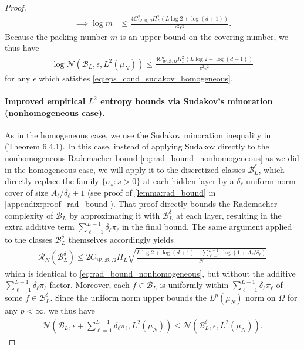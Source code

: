 \documentclass{article}
\def\cB{{\mathcal{B}}}
\def\cN{{\mathcal{N}}}
\def\cR{{\mathcal{R}}}
\def\cW{{\mathcal{W}}}
\begin{document}
\begin{appendices}
\begin{proof}
\begin{align}
    \implies \log m &\leq \frac{4 C_{\cW, \cB, \Omega}^2 \Pi_L^2 \left( L \log 2 + \log(d+1) \right)}{c^2 \epsilon^2}. 
\end{align}
Because the packing number $m$ is an upper bound on the covering number, we thus have
\begin{align} \label{eq:empirical_L2_bound_homogeneous}
    \log \cN(\cB_L, \epsilon, L^2(\mu_N)) \leq \frac{4 C_{\cW, \cB, \Omega}^2 \Pi_L^2 \left( L \log 2 + \log(d+1) \right)}{c^2 \epsilon^2}
\end{align}
for any $\epsilon$ which satisfies \eqref{eq:eps_cond_sudakov_homogeneous}.

\paragraph{Improved empirical $L^2$ entropy bounds via Sudakov's minoration (nonhomogeneous case).}
As in the homogeneous case, we use the Sudakov minoration inequality in \cite{talagrand2021upper} (Theorem 6.4.1). In this case, instead of applying Sudakov directly to the nonhomogeneous Rademacher bound \eqref{eq:rad_bound_nonhomogeneous} as we did in the homogeneous case, we will apply it to the discretized classes $\cB_L^\delta$, which directly replace the family $\{ \sigma_s: s > 0 \}$ at each hidden layer by a $\delta_\ell$ uniform norm-cover of size $A_\ell/\delta_\ell+1$ (see proof of \cref{lemma:rad_bound} in \cref{appendix:proof_rad_bound}). That proof directly bounds the Rademacher complexity of $\cB_L$ by approximating it with $\cB_L^\delta$ at each layer, resulting in the extra additive term $\sum_{\ell=1}^{L-1} \delta_\ell \pi_\ell$ in the final bound. The same argument applied to the classes $\cB_L^\delta$ themselves accordingly yields
\begin{align}
    \cR_N(\cB_L^\delta) \leq 2 C_{\cW, \cB, \Omega} \Pi_L \sqrt{\frac{L \log 2 + \log(d+1) + \sum_{\ell=1}^{L-1} \log(1+A_\ell/\delta_\ell)}{N}}
\end{align}
which is identical to \eqref{eq:rad_bound_nonhomogeneous}, but without the additive $\sum_{\ell=1}^{L-1} \delta_\ell \pi_\ell$ factor. Moreover, each $f \in \cB_L$ is uniformly within $\sum_{\ell=1}^{L-1} \delta_\ell \pi_\ell$ of some $\tilde{f} \in \cB_L^\delta$. Since the uniform norm upper bounds the $L^p(\mu_N)$ norm on $\Omega$ for any $p < \infty$, we thus have
\begin{align}
    \cN \left( \cB_L, \epsilon + \sum_{\ell=1}^{L-1} \delta_\ell \pi_\ell, L^2(\mu_N) \right) \leq \cN \left( \cB_L^\delta, \epsilon, L^2(\mu_N) \right).

\end{align}
\end{proof}
\end{appendices}
\end{document}

